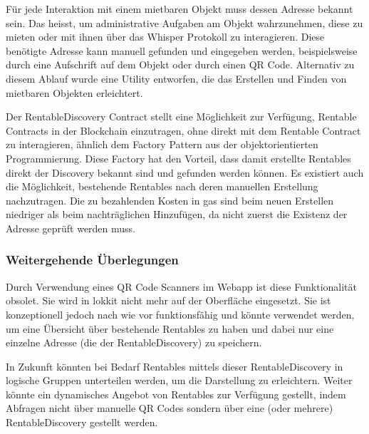 Für jede Interaktion mit einem mietbaren Objekt muss dessen Adresse bekannt sein. Das heisst, um administrative Aufgaben am Objekt wahrzunehmen, diese zu mieten oder mit ihnen über das Whisper Protokoll zu interagieren. Diese benötigte Adresse kann manuell gefunden und eingegeben werden, beispielsweise durch eine Aufschrift auf dem Objekt oder durch einen QR Code. Alternativ zu diesem Ablauf wurde eine Utility entworfen, die das Erstellen und Finden von mietbaren Objekten erleichtert.

Der RentableDiscovery Contract stellt eine Möglichkeit zur Verfügung, Rentable Contracts in der Blockchain einzutragen, ohne direkt mit dem Rentable Contract zu interagieren, ähnlich dem Factory Pattern aus der objektorientierten Programmierung. Diese Factory hat den Vorteil, dass damit erstellte Rentables direkt der Discovery bekannt sind und gefunden werden können. Es existiert auch die Möglichkeit, bestehende Rentables nach deren manuellen Erstellung nachzutragen. Die zu bezahlenden Kosten in gas sind beim neuen Erstellen niedriger als beim nachträglichen Hinzufügen, da nicht zuerst die Existenz der Adresse geprüft werden muss.

\subsubsection{Weitergehende Überlegungen}
Durch Verwendung eines QR Code Scanners im Webapp ist diese Funktionalität obsolet. Sie wird in lokkit nicht mehr auf der Oberfläche eingesetzt. Sie ist konzeptionell jedoch nach wie vor funktionsfähig und könnte verwendet werden, um eine Übersicht über bestehende Rentables zu haben und dabei nur eine einzelne Adresse (die der RentableDiscovery) zu speichern.

In Zukunft könnten bei Bedarf Rentables mittels dieser RentableDiscovery in logische Gruppen unterteilen werden, um die Darstellung zu erleichtern. Weiter könnte ein dynamisches Angebot von Rentables zur Verfügung gestellt, indem Abfragen nicht über manuelle QR Codes sondern über eine (oder mehrere) RentableDiscovery gestellt werden.
